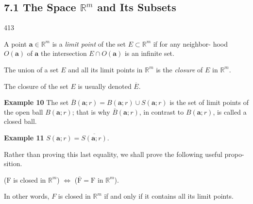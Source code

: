 \subsection{7.1 The Space $\mathbb{R}^m$ and Its Subsets}
\hfill 413
\begin{definition} \label{def:limit_point} A point $\mathbf{a} \in \mathbb{R}^m$ is a \emph{limit point} of the set $E \subset \mathbb{R}^m$ if for any neighbor-
hood $O(\mathbf{a})$ of $\mathbf{a}$ the intersection $E \cap O(\mathbf{a})$ is an infinite set.
\end{definition}

\begin{definition} \label{def:closure} The union of a set $E$ and all its limit points in $\mathbb{R}^m$ is the \emph{closure} of $E$
in $\mathbb{R}^m$.

The closure of the set $E$ is usually denoted $\overline{E}$.
\end{definition}

\textbf{Example 10} The set $\overline{B}(\mathbf{a}; r) = B(\mathbf{a}; r) \cup S(\mathbf{a}; r)$ is the set of limit points of the open
ball $B(\mathbf{a}; r)$; that is why $\overline{B}(\mathbf{a}; r)$, in contrast to $B(\mathbf{a}; r)$, is called a closed ball.

\textbf{Example 11} $S(\mathbf{a}; r) = \overline{S(\mathbf{a}; r)}$.

Rather than proving this last equality, we shall prove the following useful propo-
sition.

\begin{proposition} \label{prop:closed_iff_equals_closure} ($\text{F}$ is closed in $\mathbb{R}^m$) $\Leftrightarrow$ ($\overline{\text{F}} = \text{F}$ in $\mathbb{R}^m$).
\end{proposition}

In other words, $F$ is closed in $\mathbb{R}^m$ if and only if it contains all its limit points.

